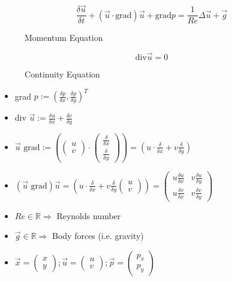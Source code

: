 \documentclass[a4paper,11pt]{scrartcl}
\begin{document}
\begin{figure}[H]
	\centering
	\[\frac{\delta \vec{u}}{\delta t} + ( \vec{u} \cdot \text{grad}) \vec{u} + \text{grad} p = \frac{1}{Re} \Delta \vec{u} + \vec{g}\]
	\renewcommand{\thefigure}{2.1.a}
    \caption{Momentum Equation}
	\label{fig:momentum}
\end{figure}
\begin{figure}[H]
	\centering
	\[\text{div} \vec{u} = 0\]
	\renewcommand{\thefigure}{2.1.b}
    \caption{Continuity Equation}
	\label{fig:cont-eq}
\end{figure}

\begin{itemize}
	\item grad $p := (\frac{\delta p}{\delta x},\frac{\delta p}{\delta y})^T$
	\item div $\vec{u} := \frac{\delta u}{\delta x} + \frac{\delta v}{\delta y}$
	\item $\vec{u} \text{ grad} := \left( \begin{pmatrix}
		u \\
		v
	\end{pmatrix}
	\cdot \begin{pmatrix}
		\frac{\delta}{\delta x} \\
		\frac{\delta}{\delta y}
	\end{pmatrix}\right)
	= (u \cdot \frac{\delta}{\delta x} + v \frac{\delta}{\delta y})$
	\item $(\vec{u} \text{ grad} ) \vec{u} = \left( u \cdot \frac{\delta}{\delta x} + v \frac{\delta}{\delta y}\begin{pmatrix}
		u \\
		v
	\end{pmatrix}\right) = \begin{pmatrix}
		u \frac{\delta u}{\delta x} & v \frac{\delta u}{\delta y}\\
		u \frac{\delta v}{\delta x} & v \frac{\delta v}{\delta y}
	\end{pmatrix}$
	\item $Re \in \mathds{R} \Rightarrow$ Reynolds number
	\item $\vec{g} \in \mathds{R} \Rightarrow$ Body forces (i.e. gravity)
	\item $\vec{x} = \begin{pmatrix}
	x\\
	y
	\end{pmatrix}; \vec{u} = \begin{pmatrix}
	u\\
	v
	\end{pmatrix}; \vec{p} = \begin{pmatrix}
	p_x \\
	p_y
	\end{pmatrix}$
\end{itemize}
\end{document}
